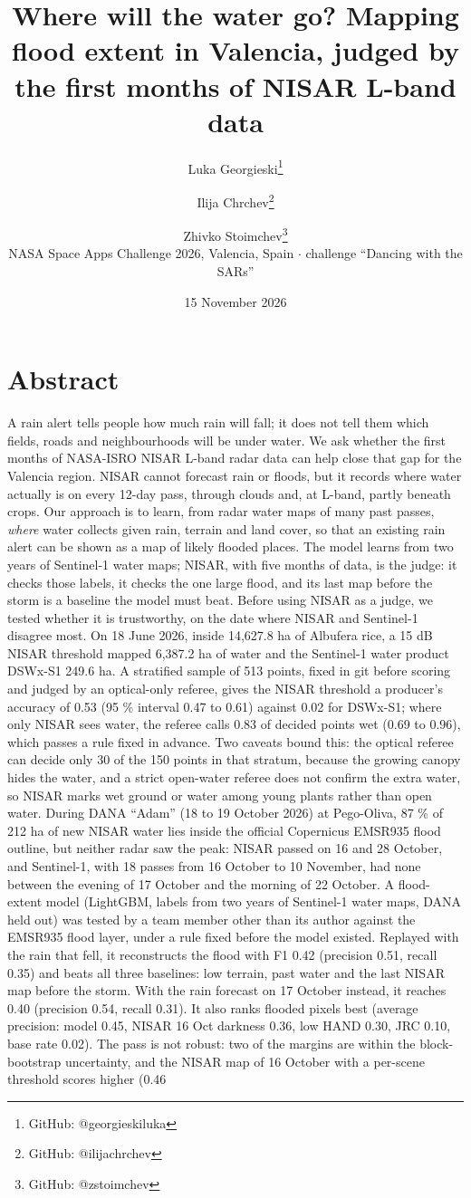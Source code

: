 \documentclass[10pt,twocolumn]{article}
\title{\Large Where will the water go? Mapping flood extent in Valencia, judged by the first months of NISAR L-band data}
\author{Luka Georgieski\thanks{GitHub: @georgieskiluka} \and Ilija Chrchev\thanks{GitHub: @ilijachrchev} \and Zhivko Stoimchev\thanks{GitHub: @zstoimchev}\\[0.3em]\small NASA Space Apps Challenge 2026, Valencia, Spain $\cdot$ challenge ``Dancing with the SARs''}
\date{15 November 2026}
\begin{document}
\maketitle
\section*{Abstract}
A rain alert tells people how much rain will fall; it does not tell them which fields, roads and neighbourhoods will be under water. We ask whether the first months of NASA-ISRO NISAR L-band radar data can help close that gap for the Valencia region. NISAR cannot forecast rain or floods, but it records where water actually is on every 12-day pass, through clouds and, at L-band, partly beneath crops. Our approach is to learn, from radar water maps of many past passes, \emph{where} water collects given rain, terrain and land cover, so that an existing rain alert can be shown as a map of likely flooded places. The model learns from two years of Sentinel-1 water maps; NISAR, with five months of data, is the judge: it checks those labels, it checks the one large flood, and its last map before the storm is a baseline the model must beat. Before using NISAR as a judge, we tested whether it is trustworthy, on the date where NISAR and Sentinel-1 disagree most. On 18 June 2026, inside 14,627.8 ha of Albufera rice, a \textminus{}15 dB NISAR threshold mapped 6,387.2 ha of water and the Sentinel-1 water product DSWx-S1 249.6 ha. A stratified sample of 513 points, fixed in git before scoring and judged by an optical-only referee, gives the NISAR threshold a producer's accuracy of 0.53 (95 \% interval 0.47 to 0.61) against 0.02 for DSWx-S1; where only NISAR sees water, the referee calls 0.83 of decided points wet (0.69 to 0.96), which passes a rule fixed in advance. Two caveats bound this: the optical referee can decide only 30 of the 150 points in that stratum, because the growing canopy hides the water, and a strict open-water referee does not confirm the extra water, so NISAR marks wet ground or water among young plants rather than open water. During DANA ``Adam'' (18 to 19 October 2026) at Pego-Oliva, 87 \% of 212 ha of new NISAR water lies inside the official Copernicus EMSR935 flood outline, but neither radar saw the peak: NISAR passed on 16 and 28 October, and Sentinel-1, with 18 passes from 16 October to 10 November, had none between the evening of 17 October and the morning of 22 October. A flood-extent model (LightGBM, labels from two years of Sentinel-1 water maps, DANA held out) was tested by a team member other than its author against the EMSR935 flood layer, under a rule fixed before the model existed. Replayed with the rain that fell, it reconstructs the flood with F1 0.42 (precision 0.51, recall 0.35) and beats all three baselines: low terrain, past water and the last NISAR map before the storm. With the rain forecast on 17 October instead, it reaches 0.40 (precision 0.54, recall 0.31). It also ranks flooded pixels best (average precision: model 0.45, NISAR 16 Oct darkness 0.36, low HAND 0.30, JRC 0.10, base rate 0.02). The pass is not robust: two of the margins are within the block-bootstrap uncertainty, and the NISAR map of 16 October with a per-scene threshold scores higher (0.46 
\end{document}
